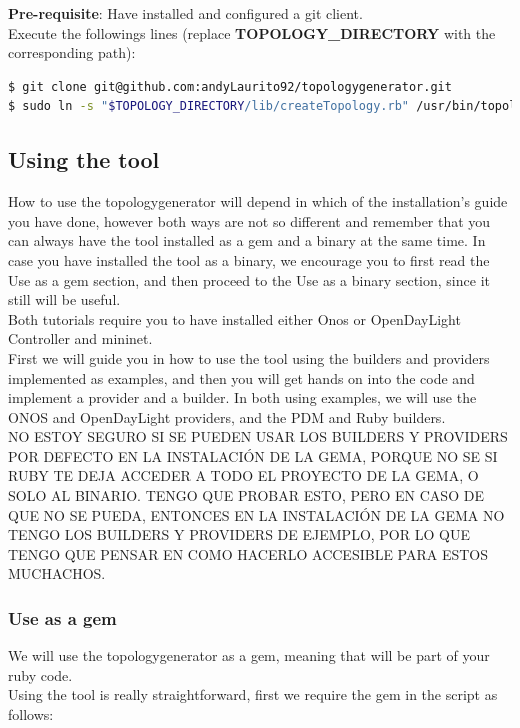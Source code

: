\textbf{Pre-requisite}: Have installed and configured a git client. \\

Execute the followings lines (replace \textbf{TOPOLOGY\_DIRECTORY} with the corresponding path):

\begin{lstlisting}[language=bash]
$ git clone git@github.com:andyLaurito92/topologygenerator.git
$ sudo ln -s "$TOPOLOGY_DIRECTORY/lib/createTopology.rb" /usr/bin/topologygenerator
\end{lstlisting}

\subsection{Using the tool}

How to use the topologygenerator will depend in which of the installation's guide you have done, however both ways are not so different and remember that you can always have the tool installed as a gem and a binary at the same time. In case you have installed the tool as a binary, we encourage you to first read the Use as a gem section, and then proceed to the Use as a binary section, since it still will be useful. \\
Both tutorials require you to have installed either Onos or OpenDayLight Controller and mininet. \\
First we will guide you in how to use the tool using the builders and providers implemented as examples, and then you will get hands on into the code and implement a provider and a builder. In both using examples, we will use the ONOS and OpenDayLight providers, and the PDM and Ruby builders. \\

NO ESTOY SEGURO SI SE PUEDEN USAR LOS BUILDERS Y PROVIDERS POR DEFECTO EN LA INSTALACIÓN DE LA GEMA, PORQUE NO SE SI RUBY TE DEJA ACCEDER A TODO EL PROYECTO DE LA GEMA, O SOLO AL BINARIO. TENGO QUE PROBAR ESTO, PERO EN CASO DE QUE NO SE PUEDA, ENTONCES EN LA INSTALACIÓN DE LA GEMA NO TENGO LOS BUILDERS Y PROVIDERS DE EJEMPLO, POR LO QUE TENGO QUE PENSAR EN COMO HACERLO ACCESIBLE PARA ESTOS MUCHACHOS.

\subsubsection{Use as a gem}

We will use the topologygenerator as a gem, meaning that will be part of your ruby code. \\
Using the tool is really straightforward, first we require the gem in the script as follows:

